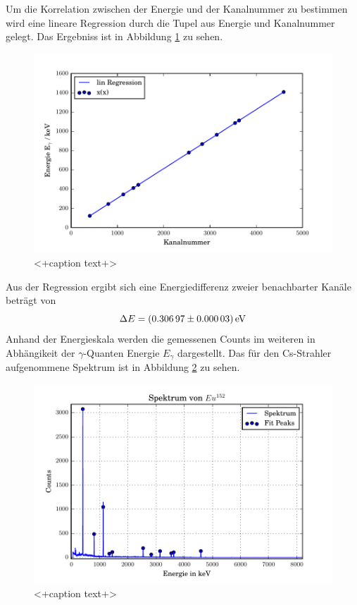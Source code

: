 Um die Korrelation zwischen der Energie und der Kanalnummer zu bestimmen wird eine lineare Regression durch die Tupel aus Energie und Kanalnummer gelegt. Das Ergebniss ist in Abbildung \ref{fig:RegCs} zu sehen. 
\begin{figure}
  \centering
  \includegraphics[width=\textwidth]{./build/CsReg.pdf}
  \caption{<+caption text+>}
  \label{fig:RegCs}
\end{figure}
Aus der Regression ergibt sich eine Energiedifferenz zweier benachbarter Kanäle beträgt von 
\begin{equation}
  \Delta E = (\num{0.30697 +- 0.00003}) \, \text{eV}
  \label{eqn:Reg}
\end{equation}
Anhand der Energieskala werden die gemessenen Counts im weiteren in Abhängikeit der $\gamma$-Quanten Energie $E_{\gamma}$ dargestellt. Das für den Cs-Strahler aufgenommene Spektrum ist in Abbildung \ref{fig:SpekCs} zu sehen. 
\begin{figure}
  \centering
  \includegraphics[width=\textwidth]{./build/SpektEu.pdf}
  \caption{<+caption text+>}
  \label{fig:SpekCs}
\end{figure}
